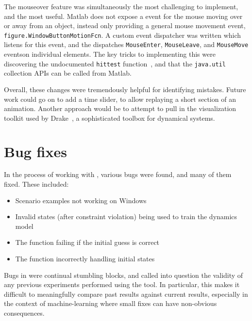 \documentclass[main.tex]{subfiles}
\begin{document}
	The mouseover feature was simultaneously the most challenging to implement, and the most useful.
	Matlab does not expose a event for the mouse moving over or away from an object, instead only providing a general mouse movement event, \texttt{figure.WindowButtonMotionFcn}.
	A custom event dispatcher was written which listens for this event, and the dispatches \texttt{MouseEnter}, \texttt{MouseLeave}, and \texttt{MouseMove} events\footnotemark on individual elements.
	The key tricks to implementing this were discovering the undocumented \texttt{hittest} function~\cite{matlab-hittest}, and that the \texttt{java.util} collection APIs can be called from Matlab.


	Overall, these changes were tremendously helpful for identifying mistakes.
	Future work could go on to add a time slider, to allow replaying a short section of an animation. Another approach would be to attempt to pull in the visualization toolkit used by Drake~\cite{drake}, a sophisticated toolbox for dynamical systems.

\section{Bug fixes}

	In the process of working with {\Pilco}, various bugs were found, and many of them fixed. These included:
	\begin{itemize}[noitemsep]
		\item Scenario examples not working on Windows
		\item Invalid states (after constraint violation) being used to train the dynamics model
		\item The  function failing if the initial guess is correct
		\item The  function incorrectly handling initial states
	\end{itemize}
	Bugs in {\Pilco} were continual stumbling blocks, and called into question the validity of any previous experiments performed using the tool.
	In particular, this makes it difficult to meaningfully compare past results against current results, especially in the context of machine-learning where small fixes can have non-obvious consequences.


\bib
\end{document}
